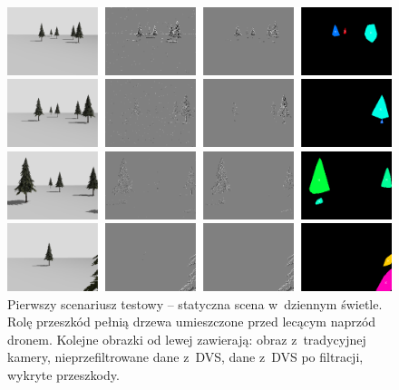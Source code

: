 \begin{figure}
    \centering
    \begin{minipage}{1\textwidth}
        \centering
        \includegraphics[width = 1\textwidth]{images/trees_day1.png}
    \end{minipage}
    \begin{minipage}{1\textwidth}
        \centering
        \includegraphics[width = 1\textwidth]{images/trees_day3.png}
    \end{minipage}
    \begin{minipage}{1\textwidth}
        \centering
        \includegraphics[width = 1\textwidth]{images/trees_day5.png}
    \end{minipage}
    \begin{minipage}{1\textwidth}
        \centering
        \includegraphics[width = 1\textwidth]{images/trees_day6.png}
    \end{minipage}
    \caption{Pierwszy scenariusz testowy -- statyczna scena w~dziennym świetle. Rolę przeszkód pełnią drzewa umieszczone przed lecącym naprzód dronem. Kolejne obrazki od lewej zawierają: obraz z~tradycyjnej kamery, nieprzefiltrowane dane z~DVS, dane z~DVS po filtracji, wykryte przeszkody.}
    \label{fig:trees_day}
\end{figure}

\vspace{11px}

